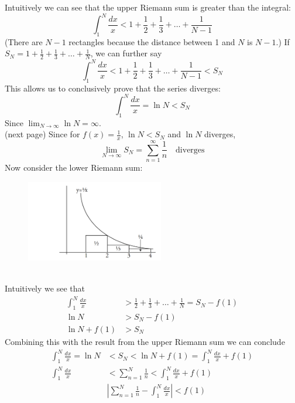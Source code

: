 \documentclass{report}
\begin{document}
Intuitively we can see that the upper Riemann sum is greater than the integral:
\begin{equation*}
\int^N_1\frac{dx}{x}<1+\frac{1}{2}+\frac{1}{3}+\ldots+\frac{1}{N-1}
\end{equation*}
(There are $N-1$ rectangles because the distance between 1 and $N$ is $N-1$.) If $S_N=1+\frac{1}{2}+\frac{1}{3}+\ldots+\frac{1}{N}$, we can further say
\begin{equation*}
\int^N_1\frac{dx}{x}<1+\frac{1}{2}+\frac{1}{3}+\ldots+\frac{1}{N-1}<S_N
\end{equation*}
This allows us to conclusively prove that the series diverges:
\begin{equation*}
\int^N_1\frac{dx}{x}=\ln N<S_N
\end{equation*}
Since $\lim_{N\to\infty}\ln N=\infty$.\\
(next page)
\newpage
\noindent Since for $f(x)=\frac{1}{x}$, $\ln N<S_N$ and $\ln N$ diverges, 
\begin{equation*}
\lim_{N\to\infty}S_N=\sum_{n=1}^\infty\frac{1}{n}\quad\text{diverges}
\end{equation*}
Now consider the lower Riemann sum:
\begin{figure}[h]
\includegraphics[width=6cm]{Capture62}\\
\centering
{}
\end{figure}\\
Intuitively we see that
\begin{align*}
\int^N_1\frac{dx}{x}&>\frac{1}{2}+\frac{1}{3}+\ldots+\frac{1}{N}=S_N-f(1)\\
\ln N&>S_N-f(1)\\
\ln N+f(1)&>S_N
\end{align*}
Combining this with the result from the upper Riemann sum we can conclude
\begin{align*}
\int^N_1\frac{dx}{x}=\ln N&<S_N<\ln N+f(1)=\int^N_1\frac{dx}{x}+f(1)\\
\int^N_1\frac{dx}{x}&<\sum_{n=1}^N\frac{1}{n}<\int^N_1\frac{dx}{x}+f(1)\\
&\left|\sum_{n=1}^N\frac{1}{n}-\int^N_1\frac{dx}{x}\right|<f(1)
\end{align*}
\newpage
\end{document}
